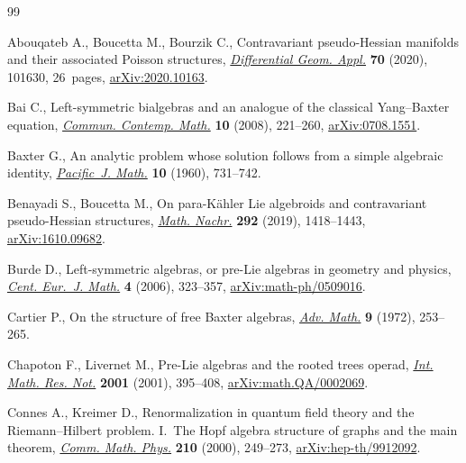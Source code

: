 \begin{thebibliography}{99}
\footnotesize\itemsep=-0.75pt

Abouqateb A., Boucetta M., Bourzik C., Contravariant pseudo-{H}essian manifolds
 and their associated {P}oisson structures, \href{https://doi.org/10.1016/j.difgeo.2020.101630}{\textit{Differential Geom. Appl.}}
 \textbf{70} (2020), 101630, 26~pages, \href{https://arxiv.org/abs/2020.10163}{arXiv:2020.10163}.

Bai C., Left-symmetric bialgebras and an analogue of the classical
 {Y}ang--{B}axter equation, \href{https://doi.org/10.1142/S0219199708002752}{\textit{Commun. Contemp. Math.}} \textbf{10}
 (2008), 221--260, \href{https://arxiv.org/abs/0708.1551}{arXiv:0708.1551}.

Baxter G., An analytic problem whose solution follows from a simple algebraic
 identity, \href{https://doi.org/10.2140/pjm.1960.10.731}{\textit{Pacific~J. Math.}} \textbf{10} (1960), 731--742.

Benayadi S., Boucetta M., On para-{K}\"{a}hler {L}ie algebroids and
 contravariant pseudo-{H}essian structures, \href{https://doi.org/10.1002/mana.201700137}{\textit{Math. Nachr.}} \textbf{292}
 (2019), 1418--1443, \href{https://arxiv.org/abs/1610.09682}{arXiv:1610.09682}.

Burde D., Left-symmetric algebras, or pre-{L}ie algebras in geometry and
 physics, \href{https://doi.org/10.2478/s11533-006-0014-9}{\textit{Cent. Eur.~J. Math.}} \textbf{4} (2006), 323--357,
 \href{https://arxiv.org/abs/math-ph/0509016}{arXiv:math-ph/0509016}.

Cartier P., On the structure of free {B}axter algebras, \href{https://doi.org/10.1016/0001-8708(72)90018-7}{\textit{Adv. Math.}}
 \textbf{9} (1972), 253--265.

Chapoton F., Livernet M., Pre-{L}ie algebras and the rooted trees operad,
 \href{https://doi.org/10.1155/S1073792801000198}{\textit{Int. Math. Res. Not.}} \textbf{2001} (2001), 395--408,
 \href{https://arxiv.org/abs/math.QA/0002069}{arXiv:math.QA/0002069}.

Connes A., Kreimer D., Renormalization in quantum field theory and the
 {R}iemann--{H}ilbert problem. {I}.~{T}he {H}opf algebra structure of graphs
 and the main theorem, \href{https://doi.org/10.1007/s002200050779}{\textit{Comm. Math. Phys.}} \textbf{210} (2000),
 249--273, \href{https://arxiv.org/abs/hep-th/9912092}{arXiv:hep-th/9912092}.


\end{thebibliography}
